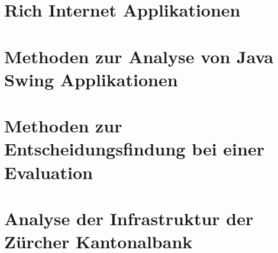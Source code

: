 \documentclass[
11pt, %
a4paper, %
BCOR15mm, %
DIV14, %
footsepline = false, %
headsepline, %
oneside,
openright,
halfparskip, %
abstracton, %
listof=totocnumbered, %
bibliography=totocnumbered %
]{scrreprt}
\begin{document}
  

  \cleardoublepage
   
   
  \chapter{Rich Internet Applikationen}\label{chapter:RichInternetApplikationen}
  
  

  \cleardoublepage
   
   
  \chapter{Methoden zur Analyse von Java Swing
  Applikationen}\label{chapter:MethodenZurAnalyseVonJavaSwingApplikationen}
  
  

  \cleardoublepage
  
   
  \chapter{Methoden zur Entscheidungsfindung bei einer
  Evaluation}\label{chapter:MethodenZurEntscheidungsfindungBeiEinerEvaluation}
  
  

  \cleardoublepage
  
   
  \chapter{Analyse der Infrastruktur der Zürcher
  Kantonalbank}\label{chapter:AnalyseDerInfrastrukturDerZuercherKantonalbank}
\end{document}
